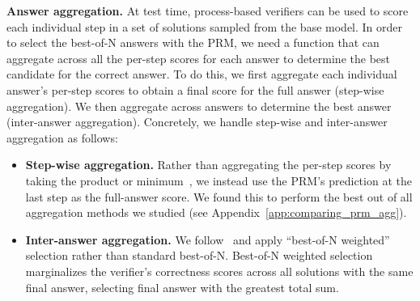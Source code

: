 \textbf{Answer aggregation.}
At test time, process-based verifiers can be used to score each individual step in a set of solutions sampled from the base model. In order to select the best-of-N answers with the PRM, we need a function that can aggregate across all the per-step scores for each answer to determine the best candidate for the correct answer. To do this, we first aggregate each individual answer's per-step scores to obtain a final score for the full answer (step-wise aggregation). We then aggregate across answers to determine the best answer (inter-answer aggregation). Concretely, we handle step-wise and inter-answer aggregation as follows:
\begin{itemize}
    \vspace{-0.2cm}
    \item \textbf{Step-wise aggregation.} Rather than aggregating the per-step scores by taking the product or minimum~\citep{wang2023mathshepherd,lightman2023lets}, we instead use the PRM's prediction at the last step as the full-answer score. We found this to perform the best out of all aggregation methods we studied (see  Appendix~\ref{app:comparing_prm_agg}).
    \item \textbf{Inter-answer aggregation.} We follow~\citet{li2023making} and apply ``best-of-N weighted'' selection rather than standard best-of-N. Best-of-N weighted selection marginalizes the verifier's correctness scores across all solutions with the same final answer, selecting final answer with the greatest total sum.
\end{itemize}

\vspace{-0.4cm}

